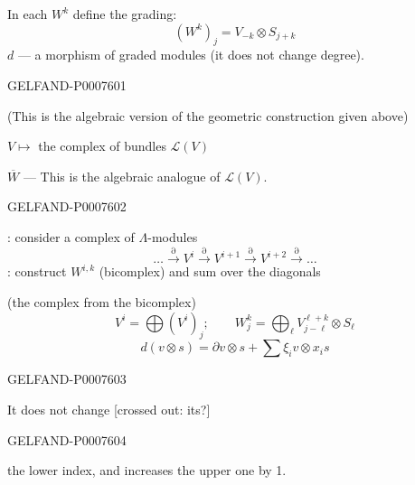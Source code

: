 In each \(W^k\) define the grading:
\[
(W^k)_j=V_{-k}\otimes S_{j+k}
\]
\(d\) --- a morphism of graded modules (it does not change degree).


\begin{GelfandAdjacentEvidence}{GELFAND-P000760}{1}

(This is the algebraic version of the geometric construction given above)

\(V\longmapsto\) the complex of bundles \(\mathcal L(V)\)

\(\overline W\) --- This is the algebraic analogue of \(\mathcal L(V)\).
\end{GelfandAdjacentEvidence}
\begin{GelfandAdjacentEvidence}{GELFAND-P000760}{2}


: consider a complex of \(\Lambda\)-modules
\[
\ldots\xrightarrow{\partial}V^i\xrightarrow{\partial}V^{i+1}
\xrightarrow{\partial}V^{i+2}\xrightarrow{\partial}\ldots
\]
: construct \(W^{i,k}\) (bicomplex) and sum over the diagonals

(the complex from the bicomplex)
\[
V^i=\bigoplus(V^i)_j;\qquad
W^k_j=\bigoplus_{\ell} V^{\ell+k}_{j-\ell}\otimes S_\ell
\]
\[
d(v\otimes s)=\partial v\otimes s+\sum\xi_i v\otimes x_i s
\]
\end{GelfandAdjacentEvidence}
\begin{GelfandAdjacentEvidence}{GELFAND-P000760}{3}


It does not change [crossed out: its?]
\end{GelfandAdjacentEvidence}
\begin{GelfandAdjacentEvidence}{GELFAND-P000760}{4}

the lower index, and increases the upper one by 1.

\end{GelfandAdjacentEvidence}
